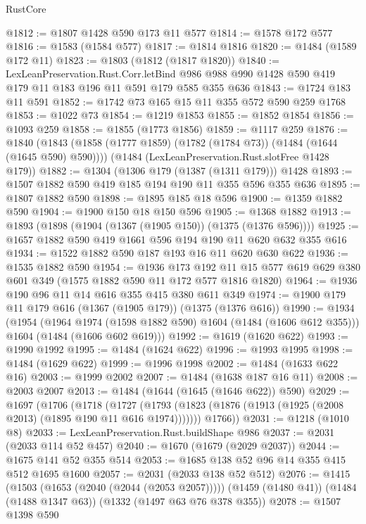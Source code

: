 \begin{lexlean}{RustCore}
\begin{coremodule}
@1812 := @1807 @1428 @590 @173 @11 @577
@1814 := @1578 @172 @577
@1816 := @1583 (@1584 @577)
@1817 := @1814 @1816
@1820 := @1484 (@1589 @172 @11)
@1823 := @1803 (@1812 (@1817 @1820))
@1840 := LexLeanPreservation.Rust.Corr.letBind
    @986
    @988
    @990
    @1428
    @590
    @419
    @179
    @11
    @183
    @196
    @11
    @591
    @179
    @585
    @355
    @636
@1843 := @1724 @183 @11 @591
@1852 := @1742 @73 @165 @15 @11 @355 @572 @590 @259 @1768
@1853 := @1022 @73
@1854 := @1219 @1853
@1855 := @1852 @1854
@1856 := @1093 @259
@1858 := @1855 (@1773 @1856)
@1859 := @1117 @259
@1876 := @1840
    (@1843 (@1858 (@1777 @1859) (@1782 (@1784 @73)) (@1484 (@1644 (@1645 @590) @590))))
    (@1484 (LexLeanPreservation.Rust.slotFree @1428 @179))
@1882 := @1304 (@1306 @179 (@1387 (@1311 @179))) @1428
@1893 := @1507 @1882 @590 @419 @185 @194 @190 @11 @355 @596 @355 @636
@1895 := @1807 @1882 @590
@1898 := @1895 @185 @18 @596
@1900 := @1359 @1882 @590
@1904 := @1900 @150 @18 @150 @596
@1905 := @1368 @1882
@1913 := @1893 (@1898 (@1904 (@1367 (@1905 @150)) (@1375 (@1376 @596))))
@1925 := @1657 @1882 @590 @419 @1661 @596 @194 @190 @11 @620 @632 @355 @616
@1934 := @1522 @1882 @590 @187 @193 @16 @11 @620 @630 @622
@1936 := @1535 @1882 @590
@1954 := @1936
    @173
    @192
    @11
    @15
    @577
    @619
    @629
    @380
    @601
    @349
    (@1575 @1882 @590 @11 @172 @577 @1816 @1820)
@1964 := @1936 @190 @96 @11 @14 @616 @355 @415 @380 @611 @349
@1974 := @1900 @179 @11 @179 @616 (@1367 (@1905 @179)) (@1375 (@1376 @616))
@1990 := @1934
    (@1954
      (@1964 @1974 (@1598 @1882 @590) @1604 (@1484 (@1606 @612 @355)))
      @1604
      (@1484 (@1606 @602 @619)))
@1992 := @1619 (@1620 @622)
@1993 := @1990 @1992
@1995 := @1484 (@1624 @622)
@1996 := @1993 @1995
@1998 := @1484 (@1629 @622)
@1999 := @1996 @1998
@2002 := @1484 (@1633 @622 @16)
@2003 := @1999 @2002
@2007 := @1484 (@1638 @187 @16 @11)
@2008 := @2003 @2007
@2013 := @1484 (@1644 (@1645 (@1646 @622)) @590)
@2029 := @1697
    (@1706
      (@1718
        (@1727 (@1793 (@1823 (@1876 (@1913 (@1925 (@2008 @2013) (@1895 @190 @11 @616 @1974)))))))
        @1766))
@2031 := @1218 (@1010 @8)
@2033 := LexLeanPreservation.Rust.buildShape @986
@2037 := @2031 (@2033 @114 @52 @457)
@2040 := @1670 (@1679 (@2029 @2037))
@2044 := @1675 @141 @52 @355 @514
@2053 := @1685 @138 @52 @96 @14 @355 @415 @512 @1695 @1600
@2057 := @2031 (@2033 @138 @52 @512)
@2076 := @1415
    (@1503 (@1653 (@2040 (@2044 (@2053 @2057)))))
    (@1459 (@1480 @41))
    (@1484 (@1488 @1347 @63))
    (@1332 (@1497 @63 @76 @378 @355))
@2078 := @1507 @1398 @590

\end{coremodule}
\end{lexlean}
